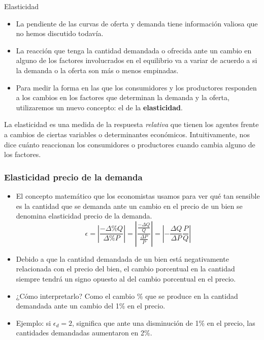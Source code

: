 \documentclass{beamer}
\begin{document}
\begin{frame}{Elasticidad}

  \begin{itemize}
    \item La pendiente de las curvas de oferta y demanda tiene información valiosa que no hemos discutido todavía.
    \item La reacción que tenga la cantidad demandada o ofrecida ante un cambio en alguno de los factores involucrados en el equilibrio va a variar de acuerdo a si la demanda o la oferta son más o menos empinadas.
    \item Para medir la forma en las que los consumidores y los productores responden a los cambios en los factores que determinan la demanda y la oferta, utilizaremos un nuevo concepto: el de la \textbf{elasticidad}. 
  \end{itemize}
  \begin{boxB}
    \centering
    La elasticidad es una medida de la respuesta  \textit{relativa} que tienen los agentes frente a cambios de ciertas variables o determinantes económicos. Intuitivamente, nos dice cuánto reaccionan los consumidores o productores cuando cambia alguno de los factores.
  \end{boxB}
\end{frame}

\begin{frame}
\frametitle{Elasticidad precio de la demanda}
\begin{itemize}
    \item El concepto matemático que los economistas usamos para ver qué tan sensible es la cantidad que se demanda ante un cambio en el precio de un bien se denomina elasticidad precio de la demanda.
    \begin{equation*}
        \epsilon = \left|\frac{- \Delta \% Q}{\Delta \% P}\right| = \left|\frac{\frac{- \Delta Q}{Q}}{\frac{\Delta P}{P}}\right| = \left|-\frac{\Delta Q}{\Delta P} \frac{P}{Q}\right|
    \end{equation*}
    \item Debido a que la cantidad demandada de un bien está negativamente relacionada con el precio del bien, el cambio porcentual en la cantidad siempre tendrá un signo opuesto al del cambio porcentual en el precio.
    \item ¿Cómo interpretarlo? Como el cambio \% que se produce en la cantidad demandada ante un cambio del 1\% en el precio.
    \item Ejemplo: si $\epsilon_d = 2$, significa que ante una disminución de 1\% en el precio, las cantidades demandadas aumentaron en 2\%.
    \end{itemize}
\end{frame}
\end{document}
